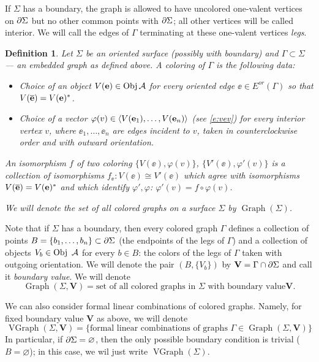 \documentclass{ws-jktr}
\newtheorem{defn}[thm]{Definition}
\DeclareMathOperator{\Obj}{Obj}
\DeclareMathOperator{\Gr}{Graph}
\DeclareMathOperator{\VGr}{VGraph}
\newcommand{\VV}{\mathbf{V}}       %
\newcommand{\Ga}{\Gamma}
\newcommand{\ph}{\varphi}
\newcommand{\Si}{\Sigma}
\begin{document}
If $\Si$ has a boundary, the graph is allowed to have uncolored one-valent
vertices on $\del \Si$ but no other common points with $\del \Si$; all
other  vertices will  be called interior.  We will  call the edges of $\Ga$
terminating at these  one-valent vertices {\em legs}.   
\begin{defn}\label{d:coloring} Let $\Si$ be an oriented surface
(possibly with boundary) and $\Ga\subset \Si$ --- an embedded graph as
defined above.  A {\em coloring} of $\Ga$ is the
following data:

  \begin{itemize}
    \item Choice of an object $V(\ee)\in \Obj \A$ for every oriented edge
        $\ee\in E^{or}(\Ga)$ so that $V(\overline{\mathbf{e}})=V(\mathbf{e})^*$.
    \item Choice of a vector $\ph(v)\in \<V(\ee_1),\dots,V(\ee_n)\>$ 
      (see \eqref{e:vev})  for    every interior vertex $v$, where 
      $\ee_1, \dots, \ee_n$ are edges incident to $v$, taken in counterclockwise 
      order and with outward orientation. %
\end{itemize}

An {\em isomorphism} $f$ of two coloring $\{V(\ee), \ph(v)\}$, $\{V'(\ee), \ph'(v)\}$ is a collection of isomorphisms $f_\ee \colon V(\ee)\cong 
V'(\ee)$ which  agree  with isomorphisms $V(\overline{\mathbf{e}})=V(\mathbf{e})^*$ and which 
identify $\ph', \ph$:  $\ph'(v)=f\circ\ph(v)$. 

We will denote the set of all colored graphs on a surface $\Si$ by
$\Gr(\Si)$.
\end{defn}


Note that if $\Si$ has a boundary, then every colored graph $\Ga$ defines
a collection of points $B=\{b_1,\dots, b_n\}\subset \del \Si$ (the
endpoints of the legs of $\Ga$) and a collection of objects $V_b\in \Obj\
\A$ for every $b \in B$: the colors of the legs of $\Ga$ taken with
outgoing orientation. We will denote the pair $(B, \{V_b\})$ by
$\VV=\Ga\cap \del\Si$ and call it {\em boundary value}. We will denote  
$$
\Gr(\Si, \VV)=\text{set of all colored graphs in $\Si$ with boundary value
} \VV.
$$ 


We can also consider formal linear combinations of colored graphs. Namely,
for fixed boundary value $\VV$ as above, we will denote 
\begin{equation}\label{e:vgr}
\VGr(\Si,\VV)=\{\text{formal linear combinations of graphs }\Ga\in
\Gr(\Si,\VV)\}
\end{equation}
In particular, if $\del \Si=\varnothing$, then the only possible boundary
condition is trivial ($B=\varnothing$); in this case, we wil just write
$\VGr(\Si)$. 
\end{document}

